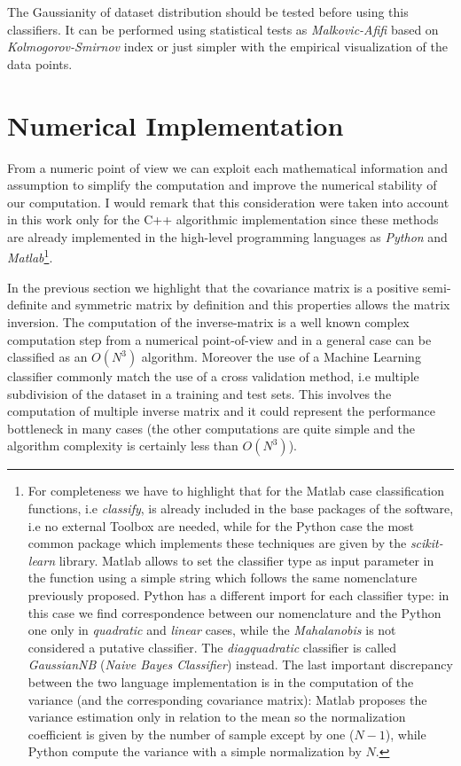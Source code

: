\documentclass{standalone}
\begin{document}
The Gaussianity of dataset distribution should be tested before using this classifiers.
It can be performed using statistical tests as \emph{Malkovic-Afifi} based on \emph{Kolmogorov-Smirnov} index or just simpler with the empirical visualization of the data points.






\section*{Numerical Implementation}

From a numeric point of view we can exploit each mathematical information and assumption to simplify the computation and improve the numerical stability of our computation.
I would remark that this consideration were taken into account in this work only for the C++ algorithmic implementation since these methods are already implemented in the high-level programming languages as \emph{Python} and \emph{Matlab}\footnote{
  For completeness we have to highlight that for the Matlab case classification functions, i.e \emph{classify}, is already included in the base packages of the software, i.e no external Toolbox are needed, while for the Python case the most common package which implements these techniques are given by the \emph{scikit-learn} library.
  Matlab allows to set the classifier type as input parameter in the function using a simple string which follows the same nomenclature previously proposed.
  Python has a different import for each classifier type: in this case we find correspondence between our nomenclature and the Python one only in \emph{quadratic} and \emph{linear} cases, while the \emph{Mahalanobis} is not considered a putative classifier.
  The \emph{diagquadratic} classifier is called \emph{GaussianNB} (\emph{Naive Bayes Classifier}) instead.
  The last important discrepancy between the two language implementation is in the computation of the variance (and the corresponding covariance matrix): Matlab proposes the variance estimation only in relation to the mean so the normalization coefficient is given by the number of sample except by one ($N-1$), while Python compute the variance with a simple normalization by $N$.
}.

In the previous section we highlight that the covariance matrix is a positive semi-definite and symmetric matrix by definition and this properties allows the matrix inversion.
The computation of the inverse-matrix is a well known complex computation step from a numerical point-of-view and in a general case can be classified as an $O(N^3)$ algorithm.
Moreover the use of a Machine Learning classifier commonly match the use of a cross validation method, i.e multiple subdivision of the dataset in a training and test sets.
This involves the computation of multiple inverse matrix and it could represent the performance bottleneck in many cases (the other computations are quite simple and the algorithm complexity is certainly less than $O(N^3)$).
\end{document}
